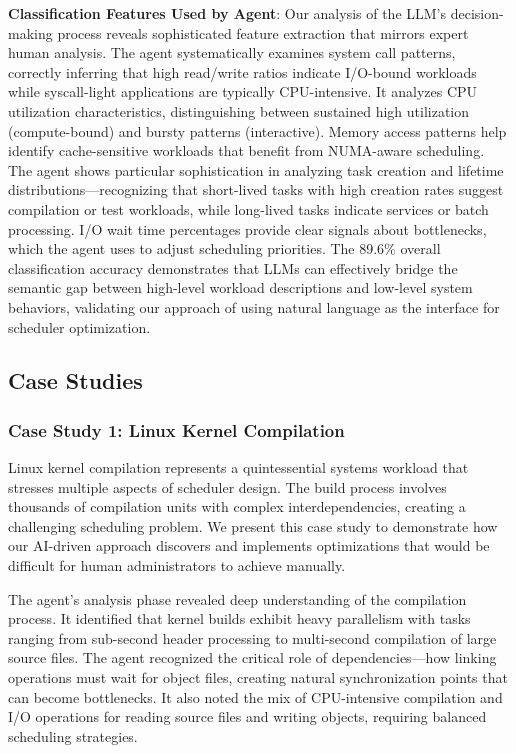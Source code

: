 \textbf{Classification Features Used by Agent}: Our analysis of the LLM's decision-making process reveals sophisticated feature extraction that mirrors expert human analysis. The agent systematically examines system call patterns, correctly inferring that high read/write ratios indicate I/O-bound workloads while syscall-light applications are typically CPU-intensive. It analyzes CPU utilization characteristics, distinguishing between sustained high utilization (compute-bound) and bursty patterns (interactive). Memory access patterns help identify cache-sensitive workloads that benefit from NUMA-aware scheduling. The agent shows particular sophistication in analyzing task creation and lifetime distributions—recognizing that short-lived tasks with high creation rates suggest compilation or test workloads, while long-lived tasks indicate services or batch processing. I/O wait time percentages provide clear signals about bottlenecks, which the agent uses to adjust scheduling priorities. The 89.6\% overall classification accuracy demonstrates that LLMs can effectively bridge the semantic gap between high-level workload descriptions and low-level system behaviors, validating our approach of using natural language as the interface for scheduler optimization.

\subsection{Case Studies}

\subsubsection{Case Study 1: Linux Kernel Compilation}

Linux kernel compilation represents a quintessential systems workload that stresses multiple aspects of scheduler design. The build process involves thousands of compilation units with complex interdependencies, creating a challenging scheduling problem. We present this case study to demonstrate how our AI-driven approach discovers and implements optimizations that would be difficult for human administrators to achieve manually.

The agent's analysis phase revealed deep understanding of the compilation process. It identified that kernel builds exhibit heavy parallelism with tasks ranging from sub-second header processing to multi-second compilation of large source files. The agent recognized the critical role of dependencies—how linking operations must wait for object files, creating natural synchronization points that can become bottlenecks. It also noted the mix of CPU-intensive compilation and I/O operations for reading source files and writing objects, requiring balanced scheduling strategies.

